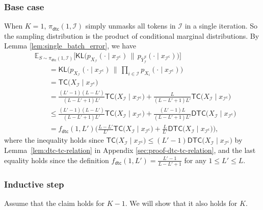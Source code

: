 \documentclass[english]{article}
\newcommand{\cI}{\mathcal{I}}
\newcommand{\KL}{\mathsf{KL}}
\newcommand{\ol}{\overline}
\newcommand{\E}{\mathbb{E}}
\newcommand{\TC}{\mathsf{TC}}
\newcommand{\DTC}{\mathsf{DTC}}
\newcommand{\dtc}{\mathsf{dtc}}
\begin{document}
\subsubsection{Base case} When $ K = 1 $, $ \pi_{\dtc}(1, \cI) $ simply unmasks all tokens in $\cI$ in a single iteration. 
So the sampling distribution is the product of conditional marginal distributions. By Lemma \ref{lem:single_batch_error}, we have
\begin{align*}
    &\E_{S \sim \pi_{\dtc}(1, \cI)} \Big[\KL \big(p_{X_{\cI}}(\cdot \mid x_{\cI^\mathsf{c}}) \,\|\, p_{\ol Y_{\cI}^S}(\cdot \mid x_{\cI^\mathsf{c}})  \big) \Big] \\
    & \qquad = \KL\Big(p_{X_{\cI}}(\cdot \mid x_{\cI^\mathsf{c}}) \,\|\, \prod_{i \in \cI} p_{X_i}(\cdot \mid x_{\cI^\mathsf{c}})   \Big) \\
    & \qquad = \TC \big(X_{\cI} \mid x_{\cI^\mathsf{c}} \big) \\
    & \qquad = \frac{(L'-1)(L-L')}{(L-L'+1)L'} \TC\big(X_{\cI} \mid x_{\cI^\mathsf{c}} \big) + \frac{L}{(L-L'+1)L'} \TC\big(X_{\cI} \mid x_{\cI^\mathsf{c}} \big) \\
    & \qquad  \leq \frac{(L'-1)(L-L')}{(L-L'+1)L'} \TC\big(X_{\cI} \mid x_{\cI^\mathsf{c}} \big) + \frac{(L'-1)L}{(L-L'+1)L'} \DTC\big(X_{\cI} \mid x_{\cI^\mathsf{c}} \big) \\
    & \qquad = f_\dtc(1, L')\bigg(\frac{L - L'}{L'} \TC\big(X_{\cI} \mid x_{\cI^\mathsf{c}} \big) + \frac{L}{L'}\DTC\big(X_{\cI} \mid x_{\cI^\mathsf{c}} \big) \bigg),
\end{align*}
where the inequality holds since $  \TC\big(X_{\cI} \mid x_{\cI^\mathsf{c}} \big) \leq (L'-1)\DTC\big(X_{\cI} \mid x_{\cI^\mathsf{c}} \big) $ by Lemma~\ref{lem:dtc-tc-relation} in Appendix \ref{sec:proof-dtc-tc-relation}, and the last equality holds since the definition $ f_\dtc(1, L') = \frac{L'-1}{L-L'+1} $ for any $ 1 \leq L' \leq L $.

\subsubsection{Inductive step} Assume that the claim holds for $ K - 1$. We will show that it also holds for $ K $.
\end{document}
